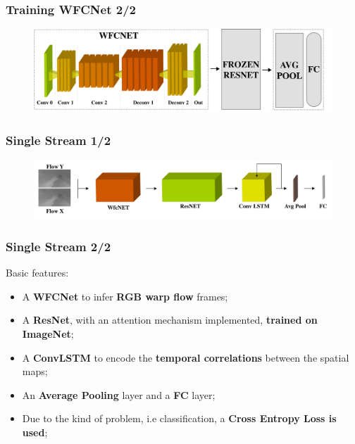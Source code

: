 \documentclass{beamer}
\begin{document}
\begin{frame}
\frametitle{Training WFCNet 2/2}

\begin{figure}
\centering
\includegraphics[height=0.40\textheight]{../schemi/training_WFC2}
\end{figure}
 
\end{frame}

\begin{frame}
\frametitle{Single Stream 1/2}

\begin{figure}
\centering
\includegraphics[width=\textwidth]{../schemi/single_stream}
\end{figure}
 
\end{frame}

\begin{frame}
\frametitle{Single Stream 2/2}

Basic features:
\begin{itemize}
\item A \textbf{WFCNet} to infer \textbf{RGB warp flow} frames;
\item A \textbf{ResNet}, with an attention mechanism implemented, \textbf{trained on ImageNet};
\item A \textbf{ConvLSTM} to encode the \textbf{temporal correlations} between the spatial maps; %
\item An \textbf{Average Pooling} layer and a \textbf{FC} layer;
\item Due to the kind of problem, i.e classification, a \textbf{Cross Entropy Loss is used};
\end{itemize}
 
\end{frame}
\end{document}
